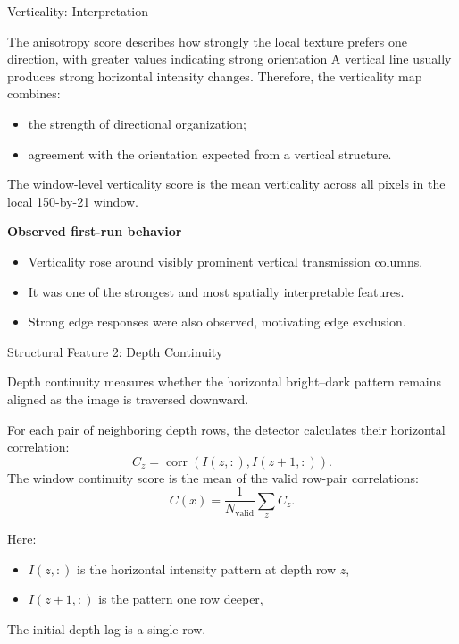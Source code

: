 \documentclass[aspectratio=169]{beamer}
\begin{document}
\begin{frame}{Verticality: Interpretation}

The anisotropy score describes how strongly the local texture prefers one
direction, with greater values indicating strong orientation
A vertical line usually produces strong horizontal intensity changes.
Therefore, the verticality map combines:

\begin{itemize}
    \item the strength of directional organization;
    \item agreement with the orientation expected from a vertical structure.
\end{itemize}

The window-level verticality score is the mean verticality across all pixels in
the local 150-by-21 window.

\vspace{0.3cm}

\textbf{Observed first-run behavior}

\begin{itemize}
    \item Verticality rose around visibly prominent vertical transmission
    columns.
    \item It was one of the strongest and most spatially interpretable
    features.
    \item Strong edge responses were also observed, motivating edge exclusion.
\end{itemize}

\end{frame}

\begin{frame}{Structural Feature 2: Depth Continuity}

Depth continuity measures whether the horizontal bright--dark pattern remains
aligned as the image is traversed downward.

For each pair of neighboring depth rows, the detector calculates their
horizontal correlation:
\[
C_z
=
\operatorname{corr}
\left(
I(z,:),
I(z+1,:)
\right).
\]
The window continuity score is the mean of the valid row-pair correlations:
\[
C(x)
=
\frac{1}{N_{\mathrm{valid}}}
\sum_z C_z.
\]
\vspace{0.3cm}

Here:
\begin{itemize}
    \item \(I(z,:)\) is the horizontal intensity pattern at depth row \(z\),
    \item \(I(z+1,:)\) is the pattern one row deeper,
\end{itemize}
The initial depth lag is a single row.
\end{frame}
\end{document}
